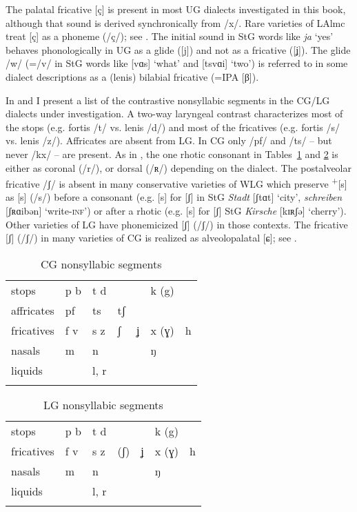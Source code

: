 The palatal fricative [ç] is present in most UG dialects investigated in this book, although that sound is derived synchronically from /x/. Rare varieties of LAlmc treat [ç] as a phoneme (/ç/); see . The initial sound in StG words like \textit{ja} ‘yes’ behaves phonologically in UG as a glide ([j]) and not as a fricative ([ʝ]). The glide /w/ (=/v/ in StG words like [vɑs] ‘what’ and [tsvɑi] ‘two’) is referred to in some dialect descriptions as a (lenis) bilabial fricative (=IPA [β]).

In  and  I present a list of the contrastive nonsyllabic segments in the CG/LG dialects under investigation. A two-way laryngeal contrast characterizes most of the stops (e.g. fortis /t/ vs. lenis /d/) and most of the fricatives (e.g. fortis  /s/ vs. lenis /z/). Affricates are absent from LG. In CG only /pf/ and /ts/ -- but never /kx/ -- are present. As in , the one rhotic consonant in Tables~\ref{tab:appendix:h:2} and \ref{tab:appendix:h:3} is either as coronal (/r/), or dorsal (/ʀ/) depending on the dialect. The postalveolar fricative /ʃ/ is absent in many conservative varieties of WLG which preserve  \textsuperscript{+}[s] as [s] (/s/) before a consonant (e.g. [s] for [ʃ] in StG \textit{Stadt} [ʃtɑt] ‘city’, \textit{schreiben} [ʃʀɑibən] ‘write-\textsc{inf}’) or after a rhotic (e.g. [s] for [ʃ] StG \textit{Kirsche} [kɪʀʃə] ‘cherry’). Other varieties of LG have phonemicized [ʃ] (/ʃ/) in those contexts. The  fricative [ʃ] (/ʃ/) in many varieties of CG is realized as alveolopalatal [ɕ]; see .

\begin{table}%
\caption{\label{tab:appendix:h:2}CG nonsyllabic segments}
\begin{tabularx}{.8\textwidth}[t]{lXXXXXX@{}}
\lsptoprule
stops & p b & t d &  &  & k (g) & \\
affricates & pf & ts & tʃ &  &  & \\
fricatives & f v & s z & ʃ & ʝ & x (ɣ) & h\\
nasals & m & n &  &  & ŋ & \\
liquids &  & l, r &  &  &  & \\
\lspbottomrule
\end{tabularx}
\end{table}

\begin{table}%
\caption{\label{tab:appendix:h:3}LG nonsyllabic segments}
\begin{tabularx}{.8\textwidth}{lXXXXXX}
\lsptoprule
stops & p b & t d &  &  & k (g) & \\
fricatives & f v & s z & (ʃ) & ʝ & x (ɣ) & h\\
nasals & m & n &  &  & ŋ & \\
liquids &  & l, r &  &  &  & \\
\lspbottomrule
\end{tabularx}
\end{table}


